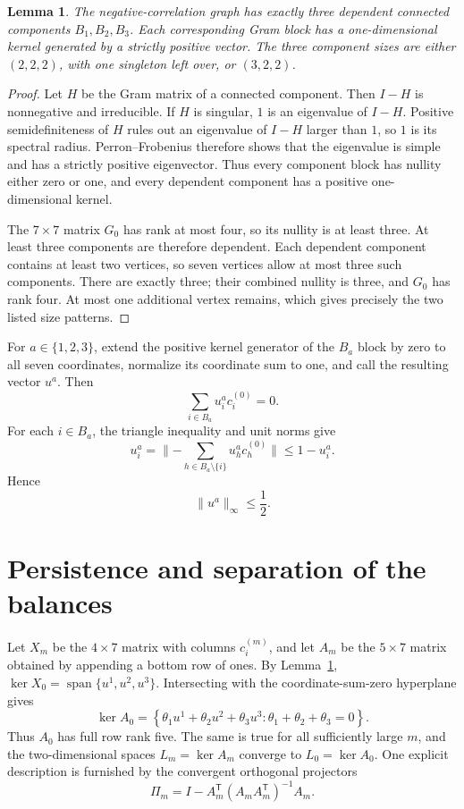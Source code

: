\documentclass[11pt]{article}
\newtheorem{lemma}[theorem]{Lemma}
\newcommand{\norm}[1]{\lVert #1\rVert}
\begin{document}
\begin{lemma}\label{lem:components}
The negative-correlation graph has exactly three dependent connected
components $B_1,B_2,B_3$.  Each corresponding Gram block has a
one-dimensional kernel generated by a strictly positive vector.  The three
component sizes are either $(2,2,2)$, with one singleton left over, or
$(3,2,2)$.
\end{lemma}

\begin{proof}
Let $H$ be the Gram matrix of a connected component.  Then $I-H$ is
nonnegative and irreducible.  If $H$ is singular, $1$ is an eigenvalue of
$I-H$.  Positive semidefiniteness of $H$ rules out an eigenvalue of $I-H$
larger than $1$, so $1$ is its spectral radius.  Perron--Frobenius therefore
shows that the eigenvalue is simple and has a strictly positive eigenvector.
Thus every component block has nullity either zero or one, and every dependent
component has a positive one-dimensional kernel.

The $7\times7$ matrix $G_0$ has rank at most four, so its nullity is at least
three.  At least three components are therefore dependent.  Each dependent
component contains at least two vertices, so seven vertices allow at most
three such components.  There are exactly three; their combined nullity is
three, and $G_0$ has rank four.  At most one additional vertex remains, which
gives precisely the two listed size patterns.
\end{proof}

For $a\in\{1,2,3\}$, extend the positive kernel generator of the $B_a$ block
by zero to all seven coordinates, normalize its coordinate sum to one, and
call the resulting vector $u^a$.  Then
\begin{equation}\label{eq:zerobalance}
 \sum_{i\in B_a}u_i^a c_i^{(0)}=0.
\end{equation}
For each $i\in B_a$, the triangle inequality and unit norms give
\[
 u_i^a
 =\norm{-\sum_{h\in B_a\setminus\{i\}}u_h^a c_h^{(0)}}
 \le1-u_i^a.
\]
Hence
\begin{equation}\label{eq:half}
 \norm{u^a}_\infty\le\frac12.
\end{equation}

\section{Persistence and separation of the balances}

Let $X_m$ be the $4\times7$ matrix with columns $c_i^{(m)}$, and let $A_m$
be the $5\times7$ matrix obtained by appending a bottom row of ones.  By
Lemma~\ref{lem:components},
$\ker X_0=\operatorname{span}\{u^1,u^2,u^3\}$.  Intersecting with the
coordinate-sum-zero hyperplane gives
\begin{equation}\label{eq:affinekernel}
 \ker A_0=
 \left\{\theta_1u^1+\theta_2u^2+\theta_3u^3:
 \theta_1+\theta_2+\theta_3=0\right\}.
\end{equation}
Thus $A_0$ has full row rank five.  The same is true for all sufficiently
large $m$, and the two-dimensional spaces $L_m=\ker A_m$ converge to
$L_0=\ker A_0$.  One explicit description is furnished by the convergent
orthogonal projectors
\[
 \Pi_m=I-A_m^{\mathsf T}(A_mA_m^{\mathsf T})^{-1}A_m.
\]
\end{document}
